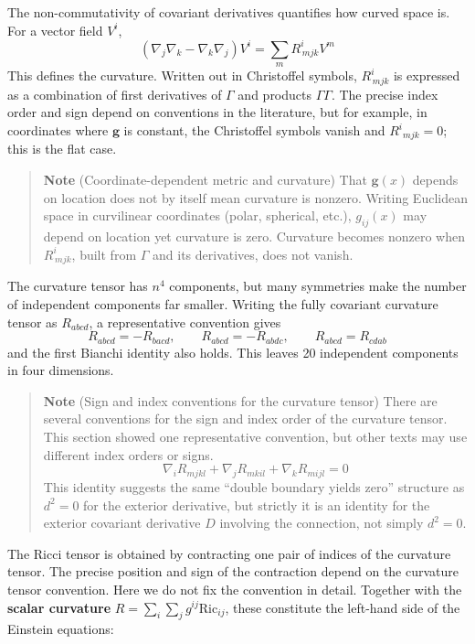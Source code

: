The non-commutativity of covariant derivatives quantifies how curved
space is. For a vector field \(V^i\),
\[(\nabla_j \nabla_k - \nabla_k \nabla_j) V^i = \sum_m R^i_{\,mjk} V^m\]
This defines the curvature. Written out in Christoffel symbols,
\(R^i_{\,mjk}\) is expressed as a combination of first derivatives of
\(\Gamma\) and products \(\Gamma\Gamma\). The precise index order and
sign depend on conventions in the literature, but for example, in
coordinates where \(\mathbf g\) is constant, the Christoffel symbols
vanish and \(R^i{}_{mjk}=0\); this is the flat case.

\begin{quote}
\textbf{Note} (Coordinate-dependent metric and curvature) That
\(\mathbf{g}(x)\) depends on location does not by itself mean curvature
is nonzero. Writing Euclidean space in curvilinear coordinates (polar,
spherical, etc.), \(g_{ij}(x)\) may depend on location yet curvature is
zero. Curvature becomes nonzero when \(R^i_{\,mjk}\), built from
\(\Gamma\) and its derivatives, does not vanish.
\end{quote}

The curvature tensor has \(n^4\) components, but many symmetries make
the number of independent components far smaller. Writing the fully
covariant curvature tensor as \(R_{abcd}\), a representative convention
gives
\[R_{abcd}=-R_{bacd},\qquad R_{abcd}=-R_{abdc},\qquad R_{abcd}=R_{cdab}\]
and the first Bianchi identity also holds. This leaves 20 independent
components in four dimensions.

\begin{quote}
\textbf{Note} (Sign and index conventions for the curvature tensor)
There are several conventions for the sign and index order of the
curvature tensor. This section showed one representative convention, but
other texts may use different index orders or signs. \[
\nabla_i R_{mjkl}+\nabla_j R_{mkil}+\nabla_k R_{mijl}=0
\] This identity suggests the same ``double boundary yields zero''
structure as \(d^2=0\) for the exterior derivative, but strictly it is
an identity for the exterior covariant derivative \(D\) involving the
connection, not simply \(d^2=0\).
\end{quote}

The Ricci tensor is obtained by contracting one pair of indices of the
curvature tensor. The precise position and sign of the contraction
depend on the curvature tensor convention. Here we do not fix the
convention in detail. Together with the \textbf{scalar curvature}
\(R = \sum_i\sum_j g^{ij} \mathrm{Ric}_{ij}\), these constitute the
left-hand side of the Einstein equations:

